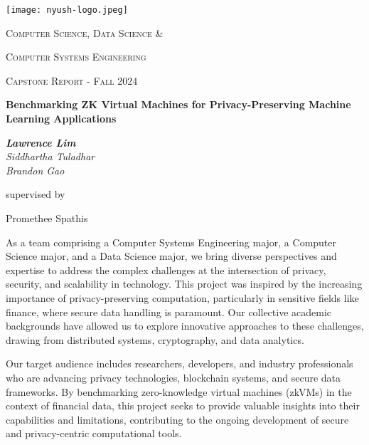 \documentclass{scrartcl}
\begin{document}
\begin{titlepage}
	\centering
	\texttt{[image: nyush-logo.jpeg]}\par
	\vspace{2cm}
	{\scshape\LARGE Computer Science, Data Science \& \par}  %
	{\scshape\LARGE Computer Systems Engineering \par}
	\vspace{1cm}
	{\scshape\Large Capstone Report - Fall 2024\par}
	\vfill

	{\huge\bfseries Benchmarking ZK Virtual Machines for Privacy-Preserving Machine Learning Applications\par}
	\vfill

	{\Large\itshape \textbf{Lawrence Lim}\\ Siddhartha Tuladhar\\ Brandon Gao\\}\par
	\vspace{1.5cm}

	\vfill
	supervised by\par
	Promethee Spathis

	\vfill
\end{titlepage}

\newpage

\begin{preface}
	As a team comprising a Computer Systems Engineering major, a Computer Science major, and a Data Science major, we bring diverse perspectives and expertise to address the complex challenges at the intersection of privacy, security, and scalability in technology. This project was inspired by the increasing importance of privacy-preserving computation, particularly in sensitive fields like finance, where secure data handling is paramount. Our collective academic backgrounds have allowed us to explore innovative approaches to these challenges, drawing from distributed systems, cryptography, and data analytics.

	Our target audience includes researchers, developers, and industry professionals who are advancing privacy technologies, blockchain systems, and secure data frameworks. By benchmarking zero-knowledge virtual machines (zkVMs) in the context of financial data, this project seeks to provide valuable insights into their capabilities and limitations, contributing to the ongoing development of secure and privacy-centric computational tools.
\end{preface}
\end{document}
